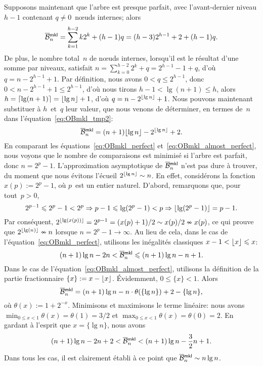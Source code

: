 Supposons maintenant que l'arbre est presque parfait, avec
l'avant-dernier niveau \(h-1\) contenant \(q \neq 0\)~nœuds
internes; alors
\begin{equation}
\OB{\fun{mkl}}{n} = \sum_{k=1}^{h-2}k2^k + (h-1)q
= (h-3)2^{h-1} + 2 + (h-1)q.
\label{eq:OBmkl_tmp2}
\end{equation}
De plus, le nombre total~\(n\) de nœuds internes, lorsqu'il est le
résultat d'une somme par niveaux, satisfait \(n = \sum_{k=0}^{h-2}2^k
+ q = 2^{h-1} - 1 + q\), d'où \(q = n - 2^{h-1} + 1\). Par définition,
nous avons \(0 < q \leqslant 2^{h-1}\), donc \(0 < n - 2^{h-1} + 1
\leqslant 2^{h-1}\), d'où nous tirons \(h - 1 < \lg(n+1) \leqslant
h\), alors \(h = \lceil{\lg(n+1)}\rceil = \lfloor{\lg n}\rfloor + 1\), d'où \(q =
n - 2^{\lfloor{\lg n}\rfloor} + 1\). Nous pouvons maintenant substituer à
\(h\)~et~\(q\) leur valeur, que nous venons de déterminer, en termes
de~\(n\) dans l'équation~\eqref{eq:OBmkl_tmp2}:
\begin{equation}
\OB{\fun{mkl}}{n} = (n+1)\floor{\lg n} - 2^{\floor{\lg n}} + 2.
\label{eq:OBmkl_almost_perfect}
\end{equation}
En comparant les équations~\eqref{eq:OBmkl_perfect}
et~\eqref{eq:OBmkl_almost_perfect}, nous voyons que le nombre de
comparaisons est minimisé si l'arbre est parfait, donc \(n = 2^p -
1\). L'approximation asymptotique de \(\OB{\fun{mkl}}{n}\) n'est pas
dure à trouver, du moment que nous évitons l'écueil \(2^{\lfloor{\lg
    n}\rfloor} \sim n\). En effet, considérons la fonction \(x(p) := 2^p -
1\), où \(p\)~est un entier naturel. D'abord, remarquons que, pour
tout~\(p>0\),
\begin{equation*}
2^{p-1} \leqslant 2^p - 1 < 2^p \Rightarrow p-1 \leqslant \lg(2^p-1) <
p \Rightarrow \lfloor{\lg(2^p-1)}\rfloor = p-1.
\end{equation*}
Par conséquent, \(2^{\lfloor{\lg(x(p))}\rfloor} = 2^{p-1} = (x(p)+1)/2 \sim
x(p)/2 \nsim x(p)\), ce qui prouve que \(2^{\lfloor{\lg(n)}\rfloor} \nsim n\)
lorsque \(n=2^p-1 \rightarrow \infty\). Au lieu de cela, dans le cas
de l'équation~\eqref{eq:OBmkl_perfect}, utilisons les inégalités
classiques \(x - 1 < \lfloor{x}\rfloor \leqslant x\):
\begin{equation*}
(n+1)\lg n - 2n < \OB{\fun{mkl}}{n} \leqslant (n+1)\lg n - n + 1.
\end{equation*}
Dans le cas de l'équation~\eqref{eq:OBmkl_almost_perfect}, utilisons
la définition de la partie fractionnaire
\(\{x\} := x - \lfloor{x}\rfloor\). Évidemment, \(0 \leqslant \{x\} <
1\). Alors
\begin{equation*}
\OB{\fun{mkl}}{n} = (n+1)\lg n - n \cdot \theta(\{\lg n\})
                    + 2 - \{\lg n\},
\end{equation*}
où \(\theta(x) := 1 + 2^{-x}\). Minimisons et maximisons le terme
linéaire: nous avons \(\min_{0 \leqslant x < 1}\theta(x) = \theta(1) =
3/2\) et \(\max_{0 \leqslant x < 1}\theta(x) = \theta(0) =
2\). En gardant à l'esprit que \(x=\{\lg n\}\), nous avons
\begin{equation*}
(n+1)\lg n - 2n + 2 < \OB{\fun{mkl}}{n} < (n+1)\lg n - \frac{3}{2}n + 1.
\end{equation*}
Dans tous les cas, il est clairement établi à ce point que
\(\OB{\fun{mkl}}{n} \sim n\lg n\).

